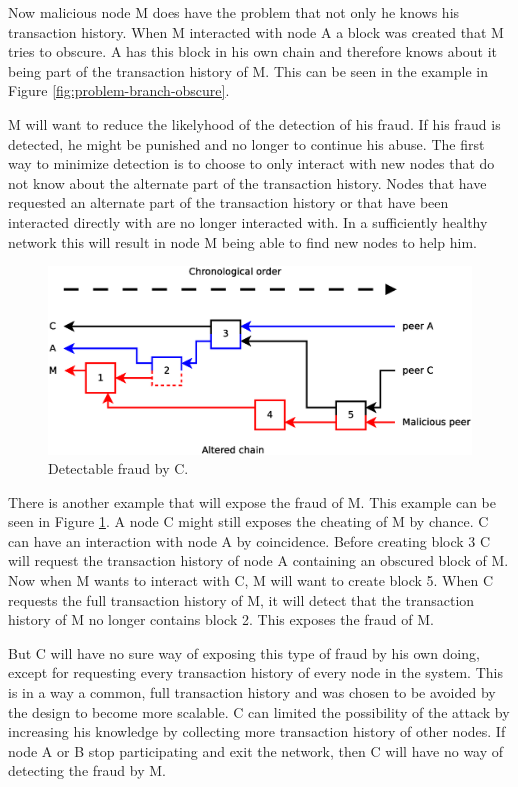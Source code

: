 Now malicious node M does have the problem that not only he knows his transaction history.
When M interacted with node A a block was created that M tries to obscure.
A has this block in his own chain
and therefore knows about it being part of the transaction history of M.
This can be seen in the example in Figure \ref{fig:problem-branch-obscure}.

M will want to reduce the likelyhood of the detection of his fraud.
If his fraud is detected, he might be punished and no longer to continue his abuse.
The first way to minimize detection is to choose
to only interact with new nodes that do not know about the alternate part of the transaction history.
Nodes that have requested an alternate part of the transaction history
or that have been interacted directly with are no longer interacted with.
In a sufficiently healthy network this will result in node M being able to find new nodes to help him.

\begin{figure}
	\centerline{\includegraphics[scale=0.3]{problems/figs/branch-fraud-detected.eps}}
	\caption{Detectable fraud by C.}
	\label{fig:problem-branch-preknowledge}
\end{figure}

There is another example that will expose the fraud of M.
This example can be seen in Figure \ref{fig:problem-branch-preknowledge}.
A node C might still exposes the cheating of M by chance.
C can have an interaction with node A by coincidence.
Before creating block 3 C will request the transaction history of node A containing an obscured block of M.
Now when M wants to interact with C, M will want to create block 5.
When C requests the full transaction history of M, it will detect that the transaction history of M no longer contains block 2.
This exposes the fraud of M.

But C will have no sure way of exposing this type of fraud by his own doing,
except for requesting every transaction history of every node in the system.
This is in a way a common, full transaction history and was chosen to be avoided by the design to become more scalable.
C can limited the possibility of the attack by increasing his knowledge by collecting more transaction history of other nodes.
If node A or B stop participating and exit the network,
then C will have no way of detecting the fraud by M.

